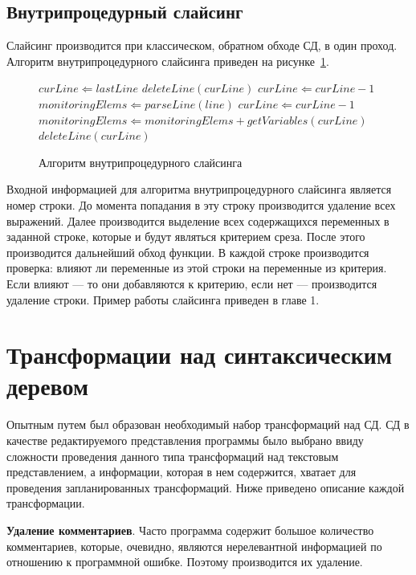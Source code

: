 \subsection{Внутрипроцедурный слайсинг}
Слайсинг производится при классическом, обратном обходе СД, в один проход. Алгоритм внутрипроцедурного слайсинга приведен на рисунке~\ref{alg:interproceduralslicing}.
\begin{figure}
\begin{algorithmic}[1]
\STATE $curLine \Leftarrow lastLine$
	\STATE $deleteLine(curLine)$
	\STATE $curLine \Leftarrow curLine - 1$
\ENDWHILE
\STATE $monitoringElems \Leftarrow parseLine(line)$
\STATE $curLine \Leftarrow curLine - 1$
		\STATE $monitoringElems \Leftarrow monitoringElems + getVariables(curLine)$ 
	\ELSE 
		\STATE $deleteLine(curLine)$ 
	\ENDIF
\ENDWHILE
\end{algorithmic}
\caption{\label{alg:interproceduralslicing}Алгоритм внутрипроцедурного слайсинга}
\end{figure}


Входной информацией для алгоритма внутрипроцедурного слайсинга является номер строки. До момента попадания в эту строку производится удаление всех выражений. Далее производится выделение всех содержащихся переменных в заданной строке, которые и будут являться критерием среза. После этого производится дальнейший обход функции. В каждой строке производится проверка: влияют ли переменные из этой строки на переменные из критерия. Если влияют --- то они добавляются к критерию, если нет --- производится удаление строки. Пример работы слайсинга приведен в главе 1.

\section{Трансформации над синтаксическим деревом}
Опытным путем был образован необходимый набор трансформаций над СД. СД в качестве редактируемого представления программы было выбрано ввиду сложности проведения данного типа трансформаций над текстовым представлением, а информации, которая в нем содержится, хватает для проведения запланированных трансформаций. Ниже приведено описание каждой трансформации. 

\textbf{Удаление комментариев}. Часто программа содержит большое количество комментариев, которые, очевидно, являются нерелевантной информацией по отношению к программной ошибке. Поэтому производится их удаление.

